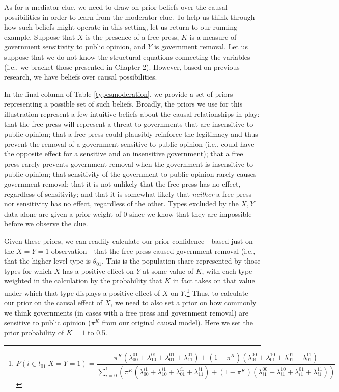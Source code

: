 \documentclass[12pt,]{book}
\let\rmarkdownfootnote\footnote%
\def\footnote{\protect\rmarkdownfootnote}
\begin{document}
As for a mediator clue, we need to draw on prior beliefs over the causal possibilities in order to learn from the moderator clue. To help us think through how such beliefs might operate in this setting, let us return to our running example. Suppose that \(X\) is the presence of a free press, \(K\) is a measure of government sensitivity to public opinion, and \(Y\) is government removal. Let us suppose that we do not know the structural equations connecting the variables (i.e., we bracket those presented in Chapter 2). However, based on previous research, we have beliefs over causal possibilities.

In the final column of Table \ref{typesmoderation}, we provide a set of priors representing a possible set of such beliefs. Broadly, the priors we use for this illustration represent a few intuitive beliefs about the causal relationships in play: that the free press will represent a threat to governments that are insensitive to public opinion; that a free press could plausibly reinforce the legitimacy and thus prevent the removal of a government sensitive to public opinion (i.e., could have the opposite effect for a sensitive and an insensitive government); that a free press rarely prevents government removal when the government is insensitive to public opinion; that sensitivity of the government to public opinion rarely causes government removal; that it is not unlikely that the free press has no effect, regardless of sensitivity; and that it is somewhat likely that \emph{neither} a free press nor sensitivity has no effect, regardless of the other. Types excluded by the \(X, Y\) data alone are given a prior weight of 0 since we know that they are impossible before we observe the clue.

Given these priors, we can readily calculate our prior confidence---based just on the \(X=Y=1\) observation---that the free press caused government removal (i.e., that the higher-level type is \(\theta_{01}\). This is the population share represented by those types for which \(X\) has a positive effect on \(Y\) at some value of \(K\), with each type weighted in the calculation by the probability that \(K\) in fact takes on that value under which that type displays a positive effect of \(X\) on \(Y\).\footnote{\[P(i \in t_{01} | X=Y=1) = \frac{
  \pi^K\left(\lambda_{00}^{01}+\lambda_{10}^{01}+\lambda_{01}^{01}+\lambda_{11}^{01}\right)
  +
  (1-\pi^K)\left(\lambda_{01}^{00}+\lambda_{01}^{10}+\lambda_{01}^{01}+\lambda_{01}^{11}\right)
  }{
  \sum_{i = 0}^1\left(\pi^K\left(\lambda_{00}^{i1}+\lambda_{10}^{i1}+\lambda_{01}^{i1}+\lambda_{11}^{i1}\right)
  +
  (1-\pi^K)\left(\lambda_{i1}^{00}+\lambda_{i1}^{10}+\lambda_{i1}^{01}+\lambda_{i1}^{11}\right)
  \right)}\]} Thus, to calculate our prior on the causal effect of \(X\), we need to also set a prior on how commonly we think governments (in cases with a free press and government removal) are sensitive to public opinion (\(\pi^K\) from our original causal model). Here we set the prior probability of \(K=1\) to 0.5.
\end{document}
